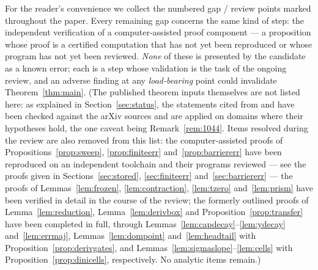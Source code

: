 \documentclass[11pt]{article}
\theoremstyle{definition}
\begin{document}
For the reader's convenience we collect the numbered gap / review
points marked throughout the paper. Every remaining gap concerns
the same kind of step: the independent verification of a
computer-assisted proof component --- a proposition whose proof is
a certified computation that has not yet been reproduced or whose
program has not yet been reviewed. \emph{None}
of these is presented by the candidate as a known error; each is a
step whose validation is the task of the ongoing review, and an
adverse finding at any \emph{load-bearing} point could invalidate
Theorem~\ref{thm:main}. (The published theorem inputs themselves are
not listed here: as explained in Section~\ref{sec:status}, the
statements cited from \cite{Polymath} and \cite{PlattTrudgian} have
been checked against the arXiv sources and are applied on domains
where their hypotheses hold, the one caveat being
Remark~\ref{rem:1044}. Items resolved during the review are also
removed from this list: the computer-assisted proofs of
Propositions~\ref{prop:sweep}, \ref{prop:finiteerr}
and~\ref{prop:barriererr} have been reproduced on an independent
toolchain and their programs reviewed --- see the proofs given in
Sections~\ref{sec:stored}, \ref{sec:finiteerr}
and~\ref{sec:barriererr} --- the proofs of
Lemmas~\ref{lem:frozen}, \ref{lem:contraction}, \ref{lem:tzero}
and~\ref{lem:prism} have been verified in detail in the course of
the review; the formerly outlined proofs of
Lemma~\ref{lem:reduction}, Lemma~\ref{lem:derivbox} and
Proposition~\ref{prop:transfer} have been completed in full,
through Lemmas~\ref{lem:capdecay}--\ref{lem:ydecay}
and~\ref{lem:errmaj}, Lemmas~\ref{lem:dompoint}
and~\ref{lem:headtail} with Proposition~\ref{prop:derivgates},
and Lemmas~\ref{lem:sigmaslope}--\ref{lem:cells} with
Proposition~\ref{prop:dinicells}, respectively. No analytic
items remain.)
\end{document}
